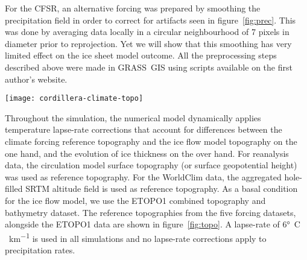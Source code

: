 For the CFSR, an alternative forcing was prepared by smoothing the precipitation field in order to correct for artifacts seen in figure~\ref{fig:prec}. This was done by averaging data locally in a circular neighbourhood of 7 pixels in diameter prior to reprojection. Yet we will show that this smoothing has very limited effect on the ice sheet model outcome. All the preprocessing steps described above were made in GRASS~GIS using scripts available on the first author's website.

\begin{figure*}[t]
	\vspace*{2mm}
	\begin{center}
		\texttt{[image: cordillera-climate-topo]}
	\end{center}
	\caption{Reference topography used for temperature lapse-rate corrections from the five climate datasets used in the study and ETOPO1 topography used as basal condition for the ice flow model.}
	\label{fig:topo}
\end{figure*}

Throughout the simulation, the numerical model dynamically applies temperature lapse-rate corrections that account for differences between the climate forcing reference topography and the ice flow model topography on the one hand, and the evolution of ice thickness on the over hand. For reanalysis data, the circulation model surface topography (or surface geopotential height) was used as reference topography. For the WorldClim data, the aggregated hole-filled SRTM altitude field is used as reference topography. As a basal condition for the ice flow model, we use the ETOPO1\citep{data:etopo1} combined topography and bathymetry dataset. The reference topographies from the five forcing datasets, alongside the ETOPO1 data are shown in figure~\ref{fig:topo}. A lapse-rate of 6\unit{\degree C\,km^{-1}} is used in all simulations and no lapse-rate corrections apply to precipitation rates.

